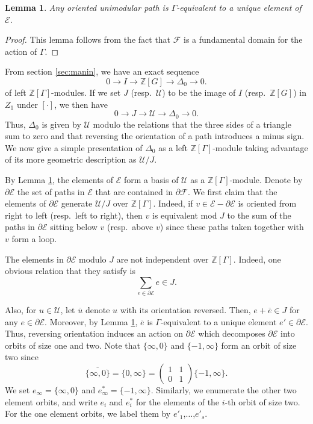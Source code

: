 \documentclass{amsart}
\theoremstyle{plain}
\newtheorem{lemma}[thm]{Lemma}
\theoremstyle{definition}
\newcommand{\E}{{\mathcal E}}
\newcommand{\F}{{\mathcal F}}
\newcommand{\U}{{\mathcal U}}
\newcommand{\Z}{{\mathbb Z}}
\newcommand{\maps}{\rightarrow}
\newcommand{\psmallmat}[4]{\left( \begin{smallmatrix} #1 & #2 \\ #3 & #4 \end{smallmatrix} \right)}
\begin{document}
\begin{lemma}
\label{lemma:gen} Any oriented unimodular path is $\Gamma$-equivalent to a unique element of $\E$.
\end{lemma}

\begin{proof}
This lemma follows from the fact that $\F$ is a fundamental domain for the action of $\Gamma$.
\end{proof}

From section \ref{sec:manin}, we have an exact sequence
$$
0 \maps I \maps \Z[G] \maps \Delta_0 \maps 0.
$$
of left $\Z[\Gamma]$-modules.  If we set $J$ (resp.\ $\U$) to be the image of $I$ (resp.\ $\Z[G]$) in $Z_1$ under $[\cdot]$, we then have
$$
0 \maps J \maps \U \maps \Delta_0 \maps 0.
$$
Thus, $\Delta_0$ is given by $\U$ modulo the relations that the three sides of a triangle sum to zero and that reversing the orientation of a path introduces a minus sign.  We now give a simple presentation of $\Delta_0$ as a left $\Z[\Gamma]$-module taking advantage of its more geometric
description as $\U /J $.

By Lemma \ref{lemma:gen}, the elements of $\E$ form a basis of $\U$  as a $\Z[\Gamma]$-module.
Denote by $\partial \E$ the set of paths in $\E$ that are
contained in $\partial \F$. We first claim that the elements of
$\partial \E$ generate $\U/J$ over $\Z[\Gamma]$.  Indeed, if $v
\in \E - \partial \E$ is oriented from right to left (resp.\ left
to right), then $v$ is equivalent mod $J$ to the sum of the paths
in $\partial \E$ sitting below $v$ (resp.\ above $v$) since these paths
taken together with $v$ form a loop.

The elements in $\partial \E$ modulo $J$ are not independent over $\Z[\Gamma]$.  Indeed, one obvious relation that they satisfy is
\begin{equation*}
 \sum_{e \in \partial \E} e \in J.
\end{equation*}


Also, for $u \in \U$, let $\overline{u}$ denote $u$ with its orientation reversed. Then, $e + \overline{e} \in J$ for any $e \in \partial \E$.  Moreover, by Lemma \ref{lemma:gen}, $\overline{e}$ is $\Gamma$-equivalent to a unique element $e' \in \partial \E$. 
Thus, reversing orientation induces an action on $\partial \E$ which  decomposes $\partial \E$ into orbits of size one and two.  Note that $\{\infty,0\}$ and $\{-1,\infty\}$ form an orbit of size
two since
$$
\overline{ \{\infty,0\} } = \{0,\infty\} = \psmallmat{1}{1}{0}{1} \{-1,\infty\}.
$$
We set $e_\infty = \{\infty,0\}$ and $e^*_\infty = \{-1,\infty\}$.
Similarly, we enumerate the other two element orbits, and write
$e_i$ and $e^*_i$ for the elements of the $i$-th orbit of size
two.  For the one element orbits, we label them by $e'_1$,$\dots$,$e'_s$.
\end{document}
